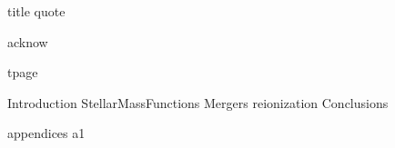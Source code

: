 
\usepackage{amssymb,amsmath}
\usepackage{mathrsfs}
\usepackage{graphicx}
\usepackage{pdflscape}
\usepackage{color}

\usepackage[super]{nth}





{title}                    %
{quote}       %
\dsp                                            %

{acknow}                   %
\ssp                                            %
\tableofcontents                                %
\newpage                                        %
\listoffigures                                  %
\newpage                                        %
\listoftables                                   %
\newpage

\dsp                                            %
{tpage}                    %
\newpage

{Introduction}
{StellarMassFunctions}               %
{Mergers}               %
{reionization}               %
{Conclusions}

\appendix
{appendices}               %
\newpage
{a1}                  %



